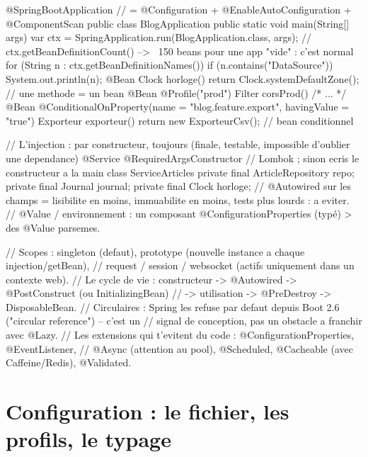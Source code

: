 \documentclass[12pt,a4paper,twoside,openright]{book}
\begin{document}
\begin{codejava}
@SpringBootApplication                // = @Configuration + @EnableAutoConfiguration + @ComponentScan
public class BlogApplication {
    public static void main(String[] args) {
        var ctx = SpringApplication.run(BlogApplication.class, args);
        // ctx.getBeanDefinitionCount()  -->  ~150 beans pour une app "vide" : c'est normal
        for (String n : ctx.getBeanDefinitionNames()) { if (n.contains("DataSource")) System.out.println(n); }
    }
    @Bean
    Clock horloge() { return Clock.systemDefaultZone(); }            // une methode = un bean
    @Bean
    @Profile("prod")
    Filter corsProd() { /* ... */ }
    @Bean
    @ConditionalOnProperty(name = "blog.feature.export", havingValue = "true")
    Exporteur exporteur() { return new ExporteurCsv(); }             // bean conditionnel
}

// L'injection : par constructeur, toujours (finale, testable, impossible d'oublier une dependance)
@Service
@RequiredArgsConstructor                 // Lombok ; sinon ecris le constructeur a la main
class ServiceArticles {
    private final ArticleRepository repo;
    private final Journal journal;
    private final Clock horloge;
    // @Autowired sur les champs = lisibilite en moins, immuabilite en moins, tests plus lourds : a eviter.
    // @Value / environnement : un composant @ConfigurationProperties (typ\'e) > des @Value parsemes.
}

// Scopes : singleton (defaut), prototype (nouvelle instance a chaque injection/getBean),
// request / session / websocket (actifs uniquement dans un contexte web).
// Le cycle de vie : constructeur -> @Autowired -> @PostConstruct (ou InitializingBean)
//                   -> utilisation -> @PreDestroy -> DisposableBean.
// Circulaires : Spring les refuse par defaut depuis Boot 2.6 ("circular reference") -- c'est un
// signal de conception, pas un obstacle a franchir avec @Lazy.
// Les extensions qui t'evitent du code : @ConfigurationProperties, @EventListener,
// @Async (attention au pool), @Scheduled, @Cacheable (avec Caffeine/Redis), @Validated.
\end{codejava}

\section{Configuration : le fichier, les profils, le typage}
\end{document}
